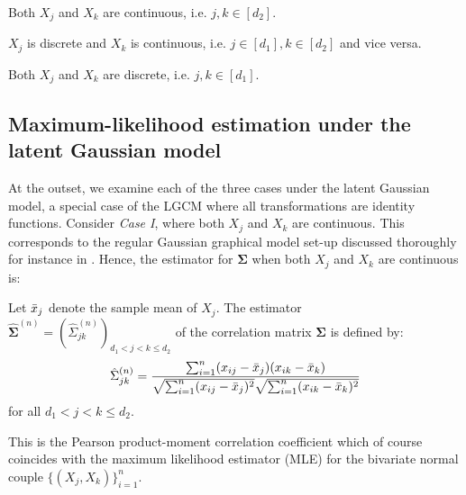 \begin{description}[labelwidth=4em,leftmargin =\dimexpr\labelwidth+\labelsep\relax, font=\mdseries]
    \item[\textit{Case I}:] Both $X_j$ and $X_k$ are continuous, i.e. $j,k \in [d_2]$.
    \item[\textit{Case II}:] $X_j$ is discrete and $X_k$ is continuous, i.e. \(j\in [d_1], k\in [d_2]\) and vice versa.
    \item[\textit{Case III}:] Both $X_j$ and $X_k$ are discrete, i.e. $j,k \in [d_1]$.
\end{description}

\subsection{Maximum-likelihood estimation under the latent Gaussian model}\label{sec::latent_gaussian}

At the outset, we examine each of the three cases under the latent Gaussian model, a special case of the LGCM where all transformations are identity functions. Consider \textit{Case I}, where both $X_j$ and $X_k$ are continuous. This corresponds to the regular Gaussian graphical model set-up discussed thoroughly for instance in \citet{Ravikumar11}. Hence, the estimator for $\mathbf\Sigma$ when both $X_j$ and $X_k$ are continuous is:
\begin{definition}\label{def1}
    Let $\Bar{x}_j$ denote the sample mean of $X_j$. The estimator $\hat{\mathbf{\Sigma}}^{(n)} = (\hat{\Sigma}_{jk}^{(n)})_{d_1 < j < k\leq d_2}$ of the correlation matrix $\mathbf{\Sigma}$ is defined by:
    \begin{equation}
            \hat{\Sigma}_{jk}^{(n)} = \frac{\sum_{i=1}^n(x_{ij}- \Bar{x}_j)(x_{ik}- \Bar{x}_k)}{\sqrt{\sum_{i=1}^n(x_{ij}- \Bar{x}_j)^2} \sqrt{\sum_{i=1}^n(x_{ik}- \Bar{x}_k)^2}}
    \end{equation}
    for all $d_1 < j < k \leq d_2$.
\end{definition}
This is the Pearson product-moment correlation coefficient which of course coincides with the maximum likelihood estimator (MLE) for the bivariate normal couple $\{(X_j, X_k)\}_{i=1}^n$.

